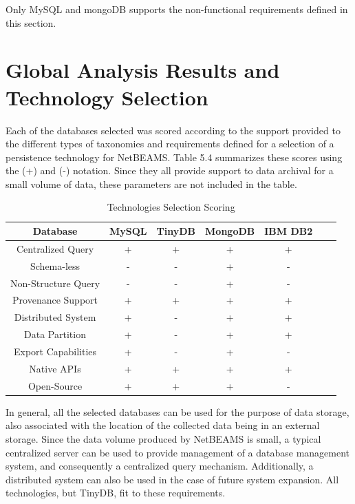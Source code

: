 Only MySQL and mongoDB supports the non-functional requirements defined in this
section.

\section{Global Analysis Results and Technology Selection}

Each of the databases selected was scored according to the support provided to
the different types of taxonomies and requirements defined for a selection of a
persistence technology for NetBEAMS. Table 5.4 summarizes these scores using
the (+) and (-) notation. Since they all provide support to data archival for
a small volume of data, these parameters are not included in the table.

\begin{table}[!b] 
    \label{tab:technology-selection}
    \caption{Technologies Selection Scoring}
    \begin{center}
        \begin{tabular}{|c|c|c|c|c|c|c|}\hline 
        \textbf{Database} & \textbf{MySQL} & \textbf{TinyDB} & \textbf{MongoDB} & \textbf{IBM DB2}\\\hline
        Centralized Query & + & + & + & + \\\hline 
        Schema-less & - & - & + & -\\\hline 
        Non-Structure Query & - & - & + & -\\\hline 
        Provenance Support & + & + & + & +\\\hline 
        Distributed System & + & - & + & +\\\hline 
        Data Partition & + & - & + & +\\\hline 
        Export Capabilities & + & - & + & -\\\hline 
        Native APIs & + & + & + & +\\\hline
        Open-Source & + & + & + & -\\\hline
        \end{tabular}
    \end{center}
\end{table}

In general, all the selected databases can be used for the purpose of data
storage, also associated with the location of the collected data being in an
external storage. Since the data volume produced by NetBEAMS is small, a
typical centralized server can be used to provide management of a database
management system, and consequently a centralized query mechanism. Additionally,
a distributed system can also be used in the case of future system expansion.
All technologies, but TinyDB, fit to these requirements.

